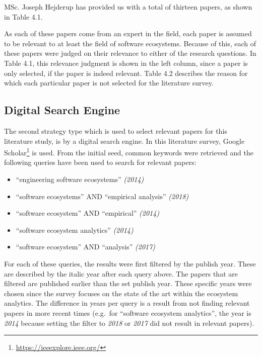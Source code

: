 \documentclass[]{book}
\providecommand{\tightlist}{%
  \setlength{\itemsep}{0pt}\setlength{\parskip}{0pt}}
\let\rmarkdownfootnote\footnote%
\def\footnote{\protect\rmarkdownfootnote}
\begin{document}
MSc. Joseph Hejderup has provided us with a total of thirteen papers, as
shown in Table 4.1.

As each of these papers come from an expert in the field, each paper is
assumed to be relevant to at least the field of software ecosystems.
Because of this, each of these papers were judged on their relevance to
either of the research questions. In Table 4.1, this relevance judgment
is shown in the left column, since a paper is only selected, if the
paper is indeed relevant. Table 4.2 describes the reason for which each
particular paper is not selected for the literature survey.

\subsection{Digital Search Engine}\label{digital-search-engine}

The second strategy type which is used to select relevant papers for
this literature study, is by a digital search engine. In this literature
survey, Google Scholar\footnote{\url{https://ieeexplore.ieee.org/}} is
used. From the initial seed, common keywords were retrieved and the
following queries have been used to search for relevant papers:

\begin{itemize}
\tightlist
\item
  ``engineering software ecosystems'' \emph{(2014)}
\item
  ``software ecosystems'' AND ``empirical analysis'' \emph{(2018)}
\item
  ``software ecosystem'' AND ``empirical'' \emph{(2014)}
\item
  ``software ecosystem analytics'' \emph{(2014)}
\item
  ``software ecosystem'' AND ``analysis'' \emph{(2017)}
\end{itemize}

For each of these queries, the results were first filtered by the
publish year. These are described by the italic year after each query
above. The papers that are filtered are published earlier than the set
publish year. These specific years were chosen since the survey focuses
on the state of the art within the ecosystem analytics. The difference
in years per query is a result from not finding relevant papers in more
recent times (e.g.~for ``software ecosystem analytics'', the year is
\emph{2014} because setting the filter to \emph{2018} or \emph{2017} did
not result in relevant papers).
\end{document}
